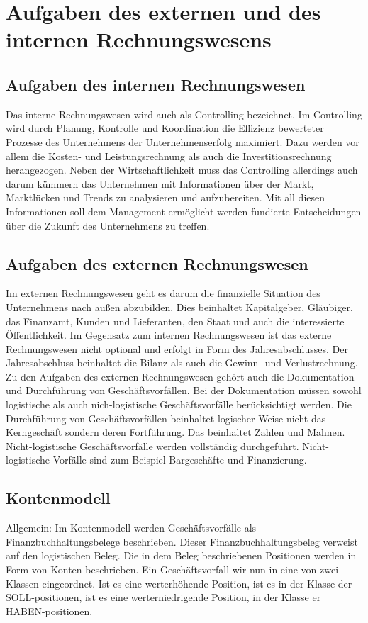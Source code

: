 %
\section{Aufgaben des externen und des internen Rechnungswesens}

\subsection{Aufgaben des internen Rechnungswesen}
Das interne Rechnungswesen wird auch als Controlling bezeichnet. Im Controlling wird durch Planung, Kontrolle und Koordination die Effizienz bewerteter Prozesse des Unternehmens der Unternehmenserfolg maximiert. Dazu werden vor allem die Kosten- und Leistungsrechnung als auch die Investitionsrechnung herangezogen.
Neben der Wirtschaftlichkeit muss das Controlling allerdings auch darum kümmern das Unternehmen mit Informationen über der Markt, Marktlücken und Trends zu analysieren und aufzubereiten. Mit all diesen Informationen soll dem Management ermöglicht werden fundierte Entscheidungen über die Zukunft des Unternehmens zu treffen.

\subsection{Aufgaben des externen Rechnungswesen}
Im externen Rechnungswesen geht es darum die finanzielle Situation des Unternehmens nach außen abzubilden. Dies beinhaltet Kapitalgeber, Gläubiger, das Finanzamt, Kunden und Lieferanten, den Staat und auch die interessierte Öffentlichkeit.
Im Gegensatz zum internen Rechnungswesen ist das externe Rechnungswesen nicht optional und erfolgt in Form des Jahresabschlusses. Der Jahresabschluss beinhaltet die Bilanz als auch die Gewinn- und Verlustrechnung.
Zu den Aufgaben des externen Rechnungswesen gehört auch die Dokumentation und Durchführung von Geschäftsvorfällen. Bei der Dokumentation müssen sowohl logistische als auch nich-logistische Geschäftsvorfälle berücksichtigt werden. Die Durchführung von Geschäftsvorfällen beinhaltet logischer Weise nicht das Kerngeschäft sondern deren Fortführung. Das beinhaltet Zahlen und Mahnen. Nicht-logistische Geschäftsvorfälle werden vollständig durchgeführt. Nicht-logistische Vorfälle sind zum Beispiel Bargeschäfte und Finanzierung.

\subsection{Kontenmodell}
Allgemein:
Im Kontenmodell werden Geschäftsvorfälle als Finanzbuchhaltungsbelege beschrieben. Dieser Finanzbuchhaltungsbeleg verweist auf den logistischen Beleg. Die in dem Beleg beschriebenen Positionen werden in Form von Konten beschrieben. Ein Geschäftsvorfall wir nun in eine von zwei Klassen eingeordnet. Ist es eine werterhöhende Position, ist es in der Klasse der SOLL-positionen, ist es eine werterniedrigende Position, in der Klasse er HABEN-positionen.

